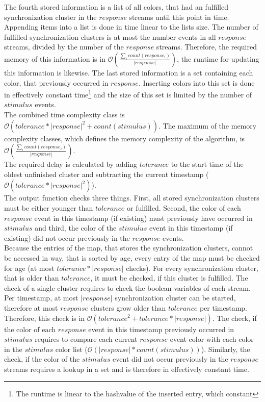 	The fourth stored information is a list of all colors, that had an fulfilled synchronization cluster in the $response$ streams until this point in time. Appending items into a list is done in time linear to the lists size. The number of fulfilled synchronization clusters is at most the number events in all $response$ streams, divided by the number of the $response$ streams. Therefore, the required memory of this information is in $\mathcal{O}\left(\frac{\sum_i count(response_i)}{|response|}\right)$, the runtime for updating this information is likewise. The last stored information is a set containing each color, that previously occurred in $response$. Inserting colors into this set is done in effectively constant time\footnote{The runtime is linear to the hashvalue of the inserted entry, which constant} and the size of this set is limited by the number of $stimulus$ events.\\
	The combined time complexity class is $\mathcal{O}(tolerance*|response|^2 + count(stimulus))$. The maximum of the memory complexity classes, which defines the memory complexity of the algorithm, is $\mathcal{O}\left(\frac{\sum_i count(response_i)}{|response|}\right)$.\\
	The required delay is calculated by adding $tolerance$ to the start time of the oldest unfinished cluster and subtracting the current timestamp ($\mathcal{O}(tolerance*|response|^2)$).\\
	The output function checks three things. First, all stored synchronization clusters must be either younger than $tolerance$ or fulfilled. Second, the color of each $response$ event in this timestamp (if existing) must previously have occurred in $stimulus$ and third, the color of the $stimulus$ event in this timestamp (if existing) did not occur previously in the $response$ events.\\
	Because the entries of the map, that stores the synchronization clusters, cannot be accessed in way, that is sorted by age, every entry of the map must be checked for age (at most $tolerance*|response|$ checks). For every synchronization cluster, that is older than $tolerance$, it must be checked, if this cluster is fulfilled. The check of a single cluster requires to check the boolean variables of each stream. Per timestamp, at most $|response|$ synchronization cluster can be started, therefore at most $response$ clusters grow older than $tolerance$ per timestamp. Therefore, this check is in $\mathcal{O}(tolerance^2+tolerance*|response|)$.
	The check, if the color of each $response$ event in this timestamp previously occurred in $stimulus$ requires to compare each current $response$ event color with each color in the $stimulus$ color list ($\mathcal{O}(|response|*count(stimulus))$). Similarly, the check, if the color of the $stimulus$ event did not occur previously in the $response$ streams requires a lookup in a set and is therefore in effectively constant time.
